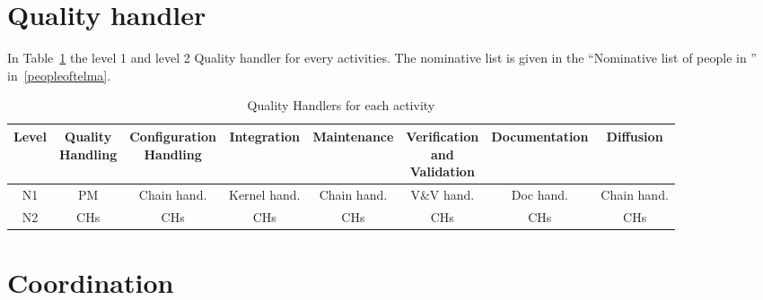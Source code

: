 \section{Quality handler}

In Table~\ref{aqTable} the level 1 and level 2 Quality handler for every
\telemacsystem{} activities. The nominative list is given in the ``Nominative
list of people in \telemacsystem'' in~\ref{peopleoftelma}.

\begin{landscape}
\begin{table}[H]
\begin{tabular}{*{8}{c}}
\toprule
Level & \minibox{Quality\\Handling} & \minibox{Configuration\\Handling} & Integration & Maintenance & \minibox[c]{Verification\\and\\Validation} & Documentation & Diffusion\\
\midrule
N1 & PM  & Chain hand. & Kernel hand. & Chain hand. & V\&V hand. & Doc hand. & Chain hand.\\
N2 & CHs & CHs         & CHs          & CHs         & CHs        & CHs       & CHs        \\
\bottomrule
\end{tabular}
\caption{\label{aqTable}Quality Handlers for each activity}
\end{table}
\end{landscape}

\section{Coordination}

